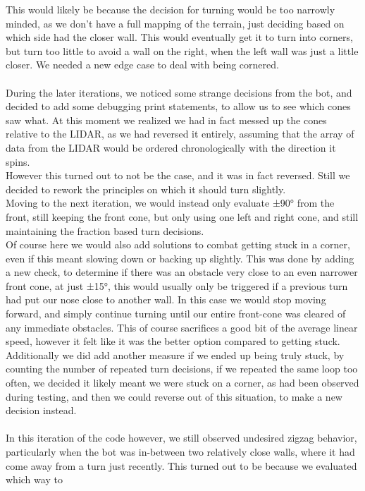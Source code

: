 \documentclass[conference]{IEEEtran}
\begin{document}
This would likely be because the decision for turning would be too narrowly minded, as we don't have a 
full mapping of the terrain, just deciding based on which side had the closer wall. 
This would eventually get it to turn into corners, but turn too little to avoid a wall on the right, 
when the left wall was just a little closer. We needed a new edge case to deal with being cornered.
\\\\
During the later iterations, we noticed some strange decisions from the bot, and decided to add some debugging print
statements, to allow us to see which cones saw what. At this moment we realized we had in fact messed up the cones 
relative to the LIDAR, as we had reversed it entirely, assuming that the array of data from the LIDAR would be ordered 
chronologically with the direction it spins. \\
However this turned out to not be the case, and it was in fact reversed. 
Still we decided to rework the principles on which it should turn slightly. \\
Moving to the next iteration, we would instead only evaluate ±90° from the front, 
still keeping the front cone, but only using one left and right cone, 
and still maintaining the fraction based turn decisions. \\
Of course here we would also add solutions to combat getting stuck in a corner, even if this meant slowing down or backing up slightly. 
This was done by adding a new check, to determine if there was an obstacle very close to an even narrower front cone, at just ±15°, 
this would usually only be triggered if a previous turn had put our nose close to another wall. 
In this case we would stop moving forward, and simply continue turning until our entire front-cone 
was cleared of any immediate obstacles. This of course sacrifices a good bit 
of the average linear speed, however it felt like it was the better option compared to getting stuck. 
Additionally we did add another measure if we ended up being truly stuck, by counting the number of repeated turn decisions, 
if we repeated the same loop too often, we decided it likely meant we were stuck on a corner, as had been observed during testing, 
and then we could reverse out of this situation, to make a new decision instead.\\\\
In this iteration of the code however, we still observed undesired zigzag behavior, particularly when the bot was in-between two
relatively close walls, where it had come away from a turn just recently. This turned out to be because we evaluated which way to
\end{document}
